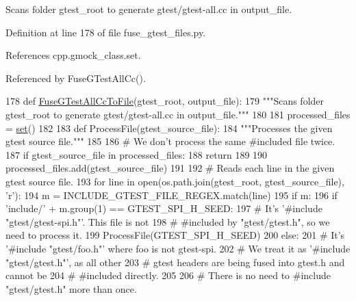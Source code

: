 \begin{DoxyVerb}Scans folder gtest_root to generate gtest/gtest-all.cc in output_file.\end{DoxyVerb}
 

Definition at line 178 of file fuse\+\_\+gtest\+\_\+files.\+py.



References cpp.\+gmock\+\_\+class.\+set.



Referenced by Fuse\+G\+Test\+All\+Cc().


\begin{DoxyCode}
178 \textcolor{keyword}{def }\hyperlink{namespacefuse__gtest__files_ae0209897b164dbb8702169630f4bbf61}{FuseGTestAllCcToFile}(gtest\_root, output\_file):
179   \textcolor{stringliteral}{"""Scans folder gtest\_root to generate gtest/gtest-all.cc in output\_file."""}
180 
181   processed\_files = \hyperlink{namespacecpp_1_1gmock__class_a2157e96eee0b4bf9ca6d195ab76f59c2}{set}()
182 
183   \textcolor{keyword}{def }ProcessFile(gtest\_source\_file):
184     \textcolor{stringliteral}{"""Processes the given gtest source file."""}
185 
186     \textcolor{comment}{# We don't process the same #included file twice.}
187     \textcolor{keywordflow}{if} gtest\_source\_file \textcolor{keywordflow}{in} processed\_files:
188       \textcolor{keywordflow}{return}
189 
190     processed\_files.add(gtest\_source\_file)
191 
192     \textcolor{comment}{# Reads each line in the given gtest source file.}
193     \textcolor{keywordflow}{for} line \textcolor{keywordflow}{in} open(os.path.join(gtest\_root, gtest\_source\_file), \textcolor{stringliteral}{'r'):}
194 \textcolor{stringliteral}{      m = INCLUDE\_GTEST\_FILE\_REGEX.match(line)}
195 \textcolor{stringliteral}{      }\textcolor{keywordflow}{if} m:
196         \textcolor{keywordflow}{if} \textcolor{stringliteral}{'include/'} + m.group(1) == GTEST\_SPI\_H\_SEED:
197           \textcolor{comment}{# It's '#include "gtest/gtest-spi.h"'.  This file is not}
198           \textcolor{comment}{# #included by "gtest/gtest.h", so we need to process it.}
199           ProcessFile(GTEST\_SPI\_H\_SEED)
200         \textcolor{keywordflow}{else}:
201           \textcolor{comment}{# It's '#include "gtest/foo.h"' where foo is not gtest-spi.}
202           \textcolor{comment}{# We treat it as '#include "gtest/gtest.h"', as all other}
203           \textcolor{comment}{# gtest headers are being fused into gtest.h and cannot be}
204           \textcolor{comment}{# #included directly.}
205 
206           \textcolor{comment}{# There is no need to #include "gtest/gtest.h" more than once.}

\end{DoxyCode}
